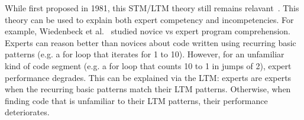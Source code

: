While first proposed in 1981, this STM/LTM theory  still remains relavant~\cite{Ma14}. This theory can be used to explain both expert competency and incompetencies.
 For example, Wiedenbeck et al.~\cite{Wi96}  studied   novice vs expert program comprehension. Experts can reason better than novices  about code written using recurring basic  patterns (e.g. a for loop that iterates for 1 to 10). However, for
an unfamiliar kind of code segment (e.g. a for loop that counts 10 to 1 in jumps of 2), expert performance degrades. This can be explained via the LTM: experts are experts when the recurring basic patterns match their LTM patterns.  Otherwise, when finding code that is unfamiliar to their LTM patterns, their performance deteriorates.



%






